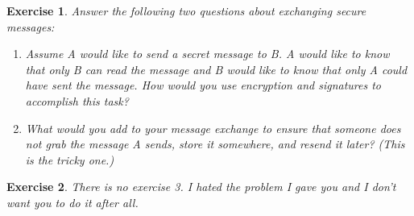 \documentclass{tufte-handout}
\newtheorem{exercise}{Exercise}
\begin{document}
\begin{exercise}

  Answer the following two questions about exchanging secure messages:
  
  \begin{enumerate}
  \item Assume A would like to send a secret message to B.  A would like to
    know that only B can read the message and B would like to know that
    only A could have sent the message.  How would you use encryption
    and signatures to accomplish this task?
  \item What would you add to your message exchange to ensure that
    someone does not grab the message A sends, store it somewhere, and
    resend it later?  (This is the tricky one.)
  \end{enumerate}  
\end{exercise}

\begin{exercise}
  There is no exercise 3.  I hated the problem I gave you and I don't
  want you to do it after all.
\end{exercise}

  
\end{document}
